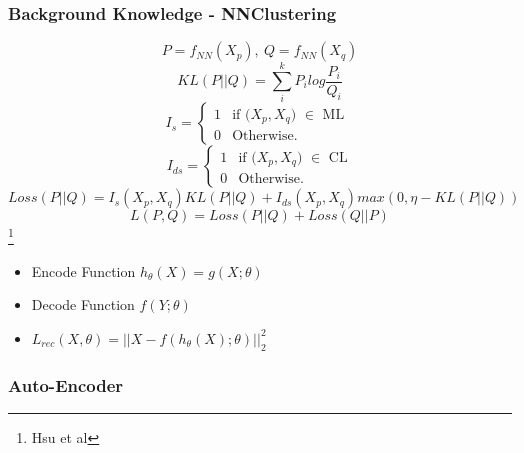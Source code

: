 \documentclass{beamer}
\begin{document}
\begin{frame}
\frametitle{Background Knowledge - NNClustering}
\begin{equation*}
  P = f_{NN}(X_p), ~ Q = f_{NN}(X_q)
\end{equation*}
\pause
\begin{equation*}
  KL(P||Q) = \sum_i^k P_ilog\frac{P_i}{Q_i}
\end{equation*}
\pause
\begin{equation*}
  I_s = \left\{
\begin{array}{ll}
  1 & \mbox{if ($X_p, X_q$) $\in$ ML }\\
  0 & \mbox{Otherwise.}
\end{array}
\right.
\end{equation*}
%
\begin{equation*}
  I_{ds} = \left\{
\begin{array}{ll}
  1 & \mbox{if ($X_p, X_q$) $\in$ CL}\\
  0 & \mbox{Otherwise.}
\end{array}
\right.
\end{equation*}
\begin{equation*}
  Loss(P || Q) = I_s(X_p, X_q)KL(P || Q) + I_{ds}(X_p, X_q)max(0,
  \eta-KL(P||Q))
\end{equation*}
\begin{equation*}
  L(P,Q) = Loss(P || Q) + Loss(Q || P)
\end{equation*}
\footnote{Hsu et al}
\end{frame}

\begin{frame}
\begin{itemize}
  \setlength\itemsep{1em}
\item Encode Function $h_{\theta}(X) = g(X; \theta)$
\item Decode Function $f(Y; \theta)$
\item $L_{rec}(X, \theta) = || X - f(h_{\theta}(X); \theta)||_2^2$
\end{itemize}
  \frametitle{Auto-Encoder}
  \begin{figure}[!h]
    \centering
    \label{fig:AE}
  \end{figure}
\end{frame}
\end{document}
